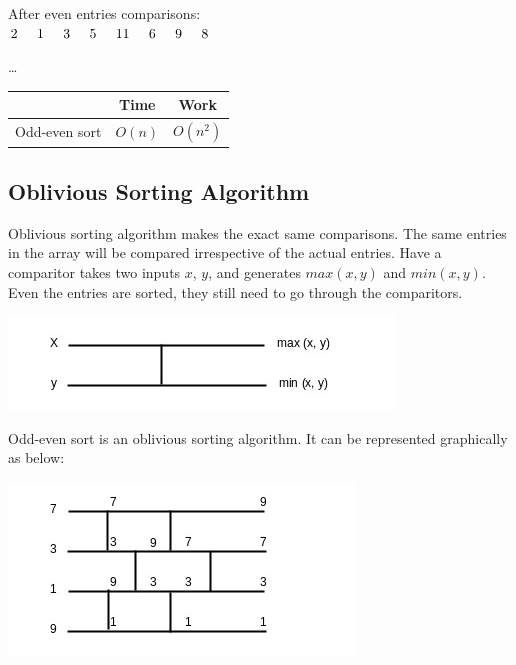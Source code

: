 \documentclass[twoside]{article}
\begin{document}
After even entries comparisons: \\
$2\hspace{0.5cm}1\hspace{0.5cm}3\hspace{0.5cm}5\hspace{0.5cm}11\hspace{0.5cm}6\hspace{0.5cm}9\hspace{0.5cm}8$

\ldots

\begin{center}
 \begin{tabular}{||c c c||} 
 \hline
      & Time & Work \\ [0.5ex] 
 \hline\hline
 Odd-even sort & $O(n)$ & $O(n^2)$ \\ 
 [1ex] 
 \hline
\end{tabular}
\end{center}



\subsection{Oblivious Sorting Algorithm}

Oblivious sorting algorithm makes the exact same comparisons. The same entries in the array will be compared irrespective of the actual entries. Have a comparitor takes two inputs $x$, $y$, and generates $max(x,y)$ and $min(x,y)$. Even the entries are sorted, they still need to go through the comparitors.

\includegraphics[scale=0.5]{g1}

Odd-even sort is an oblivious sorting algorithm. It can be represented graphically as below:

\includegraphics[scale=0.5]{g2}
\end{document}
